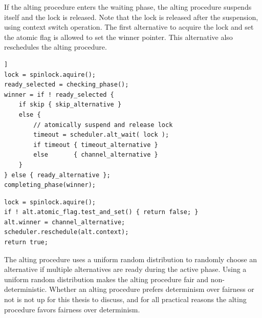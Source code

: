 If the alting procedure enters the waiting phase, the alting procedure suspends itself and the lock is released. Note that the lock is released after the suspension, using context switch operation.  The first alternative to acquire the lock and set the atomic flag is allowed to set the winner pointer. This alternative also reschedules the alting procedure.

\begin{lstfloat}
\begin{lstlisting}[caption={Code example of alting.}, label={lst:active_alting}, style={CustomC++}, xleftmargin={2em}]]
lock = spinlock.aquire();
ready_selected = checking_phase();
winner = if ! ready_selected {
    if skip { skip_alternative }
    else {
        // atomically suspend and release lock
        timeout = scheduler.alt_wait( lock );
        if timeout { timeout_alternative }
        else       { channel_alternative }
    }
} else { ready_alternative };
completing_phase(winner);
\end{lstlisting}
\end{lstfloat}

\begin{lstfloat}
\begin{lstlisting}[caption={Code example of alting.}, label={lst:passive_alting}, style={CustomC++}, xleftmargin={2em}]
lock = spinlock.aquire();
if ! alt.atomic_flag.test_and_set() { return false; }
alt.winner = channel_alternative;
scheduler.reschedule(alt.context);
return true;
\end{lstlisting}
\end{lstfloat}

The alting procedure uses a uniform random distribution to randomly choose an alternative if multiple alternatives are ready during the active phase. Using a uniform random distribution makes the alting procedure fair and non\hyp{}deterministic. Whether an alting procedure prefers determinism over fairness or not is not up for this thesis to discuss, and for all practical reasons the alting procedure favors fairness over determinism.


